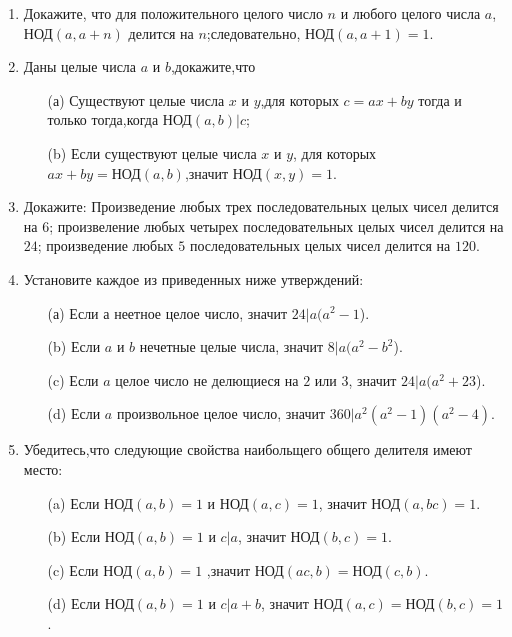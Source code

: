\documentclass[11pt]{article}
\begin{document}
\begin{enumerate}
\item Докажите, что для положительного целого число $n$ и любого целого числа $a$, $\text{НОД}(a,a+n)$ делится на $n$;следовательно, $\text{НОД}(a,a+1)=1$.

\item Даны целые числа $a$ и $b$,докажите,что
\begin{enumerate}
	\item[(а)] Существуют целые числа $x$ и $y$,для которых $c=ax+by$ тогда и только тогда,когда $\text{НОД}(a,b)|c$;
	\item[(b)] Если существуют целые числа $x$ и $y$, для которых $ax+by=\text{НОД}(a,b)$,значит $\text{НОД}(x,y)=1$.
\end{enumerate}
\item Докажите: Произведение любых трех последовательных целых чисел делится на $6$; произвеление любых четырех последовательных целых чисел делится на $24$; произведение любых $5$ последовательных целых чисел делится на $120$.
\item Установите каждое из приведенных ниже утверждений:
\begin{enumerate}
	\item[(а)] Если а неетное целое число, значит $24|a(a^{2}-1$).
	\item[(b)] Если $a$ и $b$ нечетные целые числа, значит $8|a(a^{2}-b^{2}$).
	\item[(c)] Если $a$ целое число не делющиеся на $2$ или $3$, значит $24|a(a^{2}+23$).
	\item[(d)] Если $a$ произвольное целое число, значит $360|a^{2}(a^{2}-1)(a^{2}-4)$.
\end{enumerate}

\item Убедитесь,что следующие свойства наибольщего общего делителя имеют место:
\begin{enumerate}
	\item[(a)] Если $\text{НОД}(a,b)=1$ и $\text{НОД}(a,c)=1$, значит $\text{НОД}(a,bc)=1$.
	\item[(b)] Если $\text{НОД}(a,b)=1$ и $c|a$, значит $\text{НОД}(b,c)=1$.
	\item[(c)] Если $\text{НОД}(a,b)=1$ ,значит $\text{НОД}(ac,b)=\text{НОД}(c,b)$.
	\item[(d)] Если $\text{НОД}(a,b)=1$ и $c|a+b$, значит $\text{НОД}(a,c)=\text{НОД}(b,c)=1$.
\end{enumerate}

\end{enumerate}
\end{document}
